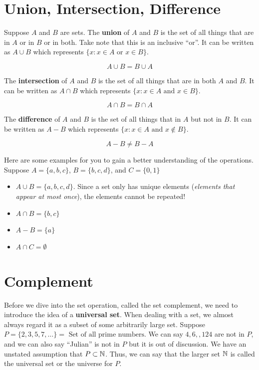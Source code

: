 \documentclass[../Latex-Setup/setup.tex]{subfiles}
\begin{document}
\section{Union, Intersection, Difference}

\indent Suppose $A$ and $B$ are sets. The \textbf{union} of $A$ and $B$ is the set of all things that are in $A$ or in $B$ or in both.
Take note that this is an inclusive ``or''. It can be written as $A \cup B$ which represents $\{x : x \in A \text{ or } x \in B\}$.\par

\[A \cup B = B \cup A\]
\par

\indent The \textbf{intersection} of $A$ and $B$ is the set of all things that are in both $A$ and $B$.
It can be written as $A \cap B$ which represents $\{x : x \in A \text{ and } x \in B\}$.\par

\[A \cap B = B \cap A\]
\par

\indent The \textbf{difference} of $A$ and $B$ is the set of all things that in $A$ but not in $B$.
It can be written as $A - B$ which represents $\{x : x \in A \text{ and } x \notin B\}$.\par

\[A - B \neq B - A\]
\par

\begin{example}
    \indent Here are some examples for you to gain a better understanding of the operations.
    Suppose $A = \{a,b,c\}$, $B = \{b,c,d\}$, and $C = \{0,1\}$\par
    \begin{itemize}
        \item $A \cup B = \{a,b,c,d\}$. Since a set only has unique elements (\textit{elements that appear at most once}), the elements cannot be repeated!
        \item $A \cap B = \{b,c\}$
        \item $A - B = \{a\}$
        \item $A \cap C = \emptyset$
    \end{itemize}
\end{example}


\section{Complement}

\indent Before we dive into the set operation, called the set complement, we need to introduce the idea of a \textbf{universal set}.
When dealing with a set, we almost always regard it as a subset of some arbitrarily large set.
Suppose $P = \{2,3,5,7,\dots\} = \text{ Set of all prime numbers}$. We can say $4,6,,124$ are not in $P$,
and we can also say ``Julian'' is not in $P$ but it is out of discussion. We have an unstated assumption that $P \subset \mathbb N$.
Thus, we can say that the larger set $\mathbb N$ is called the universal set or the universe for $P$.\par
\end{document}
